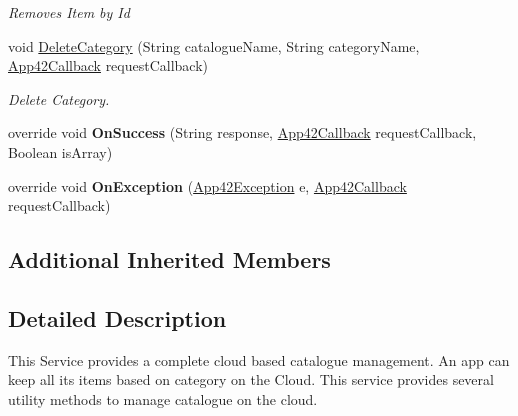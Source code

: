 \begin{DoxyCompactItemize}
\begin{DoxyCompactList}\small\item\em Removes Item by Id \end{DoxyCompactList}\item 
void \hyperlink{classcom_1_1shephertz_1_1app42_1_1paas_1_1sdk_1_1windows_1_1shopping_1_1_catalogue_service_af7a7527b5de3bdf979ac7619b157e3f5}{Delete\+Category} (String catalogue\+Name, String category\+Name, \hyperlink{interfacecom_1_1shephertz_1_1app42_1_1paas_1_1sdk_1_1windows_1_1_app42_callback}{App42\+Callback} request\+Callback)
\begin{DoxyCompactList}\small\item\em Delete Category. \end{DoxyCompactList}\item 
\hypertarget{classcom_1_1shephertz_1_1app42_1_1paas_1_1sdk_1_1windows_1_1shopping_1_1_catalogue_service_ae66dd8d664657f5b054b4ad5780fd77e}{override void {\bfseries On\+Success} (String response, \hyperlink{interfacecom_1_1shephertz_1_1app42_1_1paas_1_1sdk_1_1windows_1_1_app42_callback}{App42\+Callback} request\+Callback, Boolean is\+Array)}\label{classcom_1_1shephertz_1_1app42_1_1paas_1_1sdk_1_1windows_1_1shopping_1_1_catalogue_service_ae66dd8d664657f5b054b4ad5780fd77e}

\item 
\hypertarget{classcom_1_1shephertz_1_1app42_1_1paas_1_1sdk_1_1windows_1_1shopping_1_1_catalogue_service_a9d1aa37dd408b468ded9d93a2c677fad}{override void {\bfseries On\+Exception} (\hyperlink{classcom_1_1shephertz_1_1app42_1_1paas_1_1sdk_1_1windows_1_1_app42_exception}{App42\+Exception} e, \hyperlink{interfacecom_1_1shephertz_1_1app42_1_1paas_1_1sdk_1_1windows_1_1_app42_callback}{App42\+Callback} request\+Callback)}\label{classcom_1_1shephertz_1_1app42_1_1paas_1_1sdk_1_1windows_1_1shopping_1_1_catalogue_service_a9d1aa37dd408b468ded9d93a2c677fad}

\end{DoxyCompactItemize}
\subsection*{Additional Inherited Members}


\subsection{Detailed Description}
This Service provides a complete cloud based catalogue management. An app can keep all its items based on category on the Cloud. This service provides several utility methods to manage catalogue on the cloud. 

